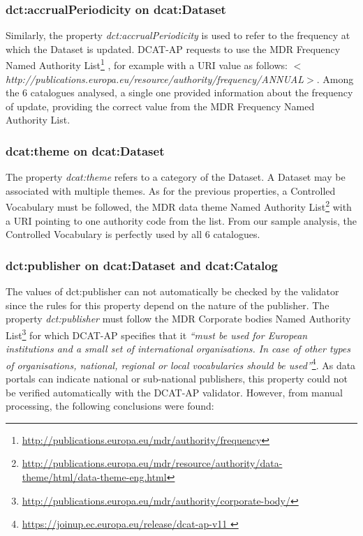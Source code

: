 \documentclass[<options>]{elsarticle}
\begin{document}
\subsubsection{dct:accrualPeriodicity on dcat:Dataset}
Similarly, the property \textit{dct:accrualPeriodicity} is used to refer to the frequency at which the Dataset is updated. DCAT-AP requests to use the MDR Frequency Named Authority List\footnote{\href{    http://publications.europa.eu/mdr/authority/frequency}{     http://publications.europa.eu/mdr/authority/frequency}} , for example with a URI value as follows: \textit{$<$http://publications.europa.eu/resource/authority/frequency/ANNUAL$>$}. Among the 6 catalogues analysed, a single one provided information about the frequency of update, providing the correct value from the MDR Frequency Named Authority List.

\subsubsection{dcat:theme on dcat:Dataset}

The property \textit{dcat:theme }refers to a category of the Dataset. A Dataset may be associated with multiple themes. As for the previous properties, a Controlled Vocabulary must be followed, the MDR data theme Named Authority List\footnote{\href{     http://publications.europa.eu/mdr/resource/authority/data-theme/html/data-theme-eng.html}{      http://publications.europa.eu/mdr/resource/authority/data-theme/html/data-theme-eng.html}}  with a URI pointing to one authority code from the list. From our sample analysis, the Controlled Vocabulary is perfectly used by all 6 catalogues.

\subsubsection{dct:publisher on dcat:Dataset and dcat:Catalog}
The values of dct:publisher can not automatically be checked by the validator since the rules for this property depend on the nature of the publisher. The property \textit{dct:publisher} must follow the MDR Corporate bodies Named Authority List\footnote{\href{      http://publications.europa.eu/mdr/authority/corporate-body/}{http://publications.europa.eu/mdr/authority/corporate-body/}} for which DCAT-AP specifies that it \textit{“must be used for European institutions and a small set of international organisations. In case of other types of organisations, national, regional or local vocabularies should be used”}\footnote{\href{https://joinup.ec.europa.eu/release/dcat-ap-v11}{    https://joinup.ec.europa.eu/release/dcat-ap-v11 }}. As data portals can indicate national or sub-national publishers, this property could not be verified automatically with the DCAT-AP validator. However, from manual processing, the following conclusions were found:
\end{document}
